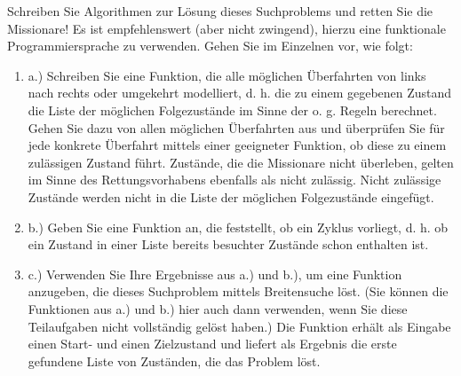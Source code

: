 \documentclass{bschlangaul-aufgabe}
\begin{document}
Schreiben Sie Algorithmen zur Lösung dieses Suchproblems und retten Sie
die Missionare! Es ist empfehlenswert (aber nicht zwingend), hierzu eine
funktionale Programmiersprache zu verwenden. Gehen Sie im Einzelnen vor,
wie folgt:
\begin{enumerate}

\item a.) Schreiben Sie eine Funktion, die alle möglichen Überfahrten
von links nach rechts oder umgekehrt modelliert, d. h. die zu einem
gegebenen Zustand die Liste der möglichen Folgezustände im Sinne der o.
g. Regeln berechnet. Gehen Sie dazu von allen möglichen Überfahrten aus
und überprüfen Sie für jede konkrete Überfahrt mittels einer geeigneter
Funktion, ob diese zu einem zulässigen Zustand führt. Zustände, die die
Missionare nicht überleben, gelten im Sinne des Rettungsvorhabens
ebenfalls als nicht zulässig. Nicht zulässige Zustände werden nicht in
die Liste der möglichen Folgezustände eingefügt.

\item b.) Geben Sie eine Funktion an, die feststellt, ob ein Zyklus
vorliegt, d. h. ob ein Zustand in einer Liste bereits besuchter Zustände
schon enthalten ist.

\item c.) Verwenden Sie Ihre Ergebnisse aus a.) und b.), um eine
Funktion anzugeben, die dieses Suchproblem mittels Breitensuche löst.
(Sie können die Funktionen aus a.) und b.) hier auch dann verwenden,
wenn Sie diese Teilaufgaben nicht vollständig gelöst haben.) Die
Funktion erhält als Eingabe einen Start- und einen Zielzustand und
liefert als Ergebnis die erste gefundene Liste von Zuständen, die das
Problem löst.
\end{enumerate}
\end{document}
